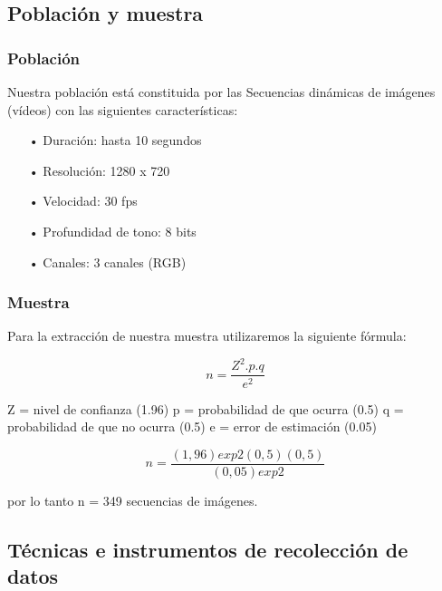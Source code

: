 \subsection{Población y muestra}
\subsubsection{Población}
Nuestra población está constituida por las Secuencias dinámicas de imágenes (vídeos) con las siguientes características:

\begin{itemize}
\item[•] Duración: hasta 10 segundos
\item[•] Resolución:  1280 x 720 
\item[•] Velocidad: 30 fps 
\item[•] Profundidad de tono: 8 bits 
\item[•] Canales: 3 canales (RGB)
\end{itemize}

\subsubsection{Muestra}
Para la extracción de nuestra muestra utilizaremos la siguiente fórmula:

\begin{equation}
 n = \frac{Z^{2}.p.q}{e^{2}}
\end{equation}

\vskip 1cm

Z = nivel de confianza (1.96) \vskip 0.1cm
p = probabilidad de que ocurra (0.5) \vskip 0.1cm
q = probabilidad de que no ocurra (0.5) \vskip 0.1cm
e = error de estimación (0.05) 

\begin{equation}
 n = \frac{(1,96)exp2(0,5)(0,5)}{(0,05)exp2}
\end{equation}

\vskip 0.5cm

por lo tanto n = 349 secuencias de imágenes.

\vskip 4.5cm

\subsection{Técnicas e instrumentos de recolección de datos}

